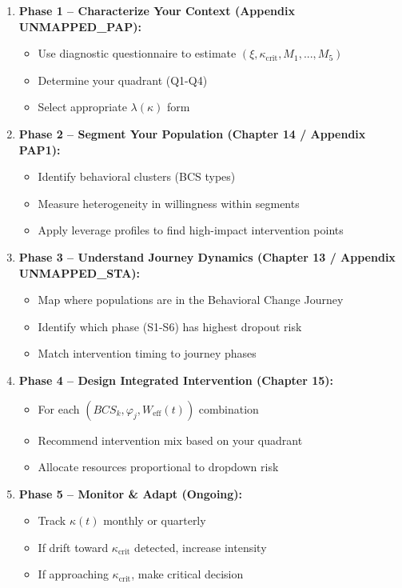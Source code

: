 \documentclass[11pt, a4paper]{article}
\begin{document}
\begin{enumerate}
    \item \textbf{Phase 1 – Characterize Your Context (Appendix UNMAPPED_PAP):}
    \begin{itemize}
        \item Use diagnostic questionnaire to estimate $(\xi, \kappa_{\text{crit}}, M_1,...,M_5)$
        \item Determine your quadrant (Q1-Q4)
        \item Select appropriate $\lambda(\kappa)$ form
    \end{itemize}

    \item \textbf{Phase 2 – Segment Your Population (Chapter 14 / Appendix PAP1):}
    \begin{itemize}
        \item Identify behavioral clusters (BCS types)
        \item Measure heterogeneity in willingness within segments
        \item Apply leverage profiles to find high-impact intervention points
    \end{itemize}

    \item \textbf{Phase 3 – Understand Journey Dynamics (Chapter 13 / Appendix UNMAPPED_STA):}
    \begin{itemize}
        \item Map where populations are in the Behavioral Change Journey
        \item Identify which phase (S1-S6) has highest dropout risk
        \item Match intervention timing to journey phases
    \end{itemize}

    \item \textbf{Phase 4 – Design Integrated Intervention (Chapter 15):}
    \begin{itemize}
        \item For each $(BCS_k, \varphi_j, W_{\text{eff}}(t))$ combination
        \item Recommend intervention mix based on your quadrant
        \item Allocate resources proportional to dropdown risk
    \end{itemize}

    \item \textbf{Phase 5 – Monitor \& Adapt (Ongoing):}
    \begin{itemize}
        \item Track $\kappa(t)$ monthly or quarterly
        \item If drift toward $\kappa_{\text{crit}}$ detected, increase intensity
        \item If approaching $\kappa_{\text{crit}}$, make critical decision
    \end{itemize}
\end{enumerate}
\end{document}
